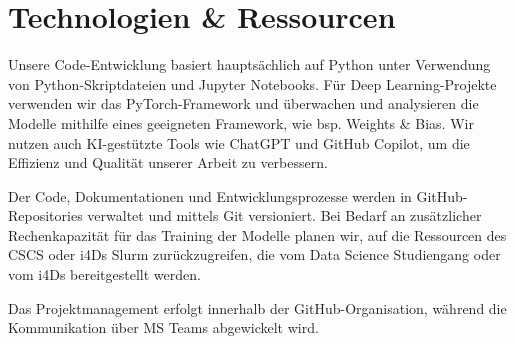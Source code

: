 \section{Technologien \& Ressourcen}
Unsere Code-Entwicklung basiert hauptsächlich auf Python unter Verwendung von Python-Skriptdateien und Jupyter Notebooks. Für Deep Learning-Projekte verwenden wir das PyTorch-Framework und überwachen und analysieren die Modelle mithilfe eines geeigneten Framework, wie bsp. Weights \& Bias. Wir nutzen auch KI-gestützte Tools wie ChatGPT und GitHub Copilot, um die Effizienz und Qualität unserer Arbeit zu verbessern.

Der Code, Dokumentationen und Entwicklungsprozesse werden in GitHub-Repositories verwaltet und mittels Git versioniert. Bei Bedarf an zusätzlicher Rechenkapazität für das Training der Modelle planen wir, auf die Ressourcen des CSCS oder i4Ds Slurm zurückzugreifen, die vom Data Science Studiengang oder vom i4Ds bereitgestellt werden.

Das Projektmanagement erfolgt innerhalb der GitHub-Organisation, während die Kommunikation über MS Teams abgewickelt wird.